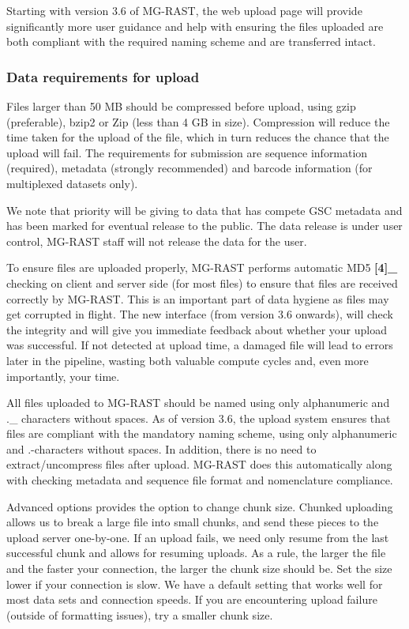 \documentclass[letterpaper,10pt,english]{sphinxmanual}
\begin{document}
Starting with version 3.6 of MG-RAST, the web upload page will provide
significantly more user guidance and help with ensuring the files
uploaded are both compliant with the required naming scheme and are
transferred intact.


\subsubsection{Data requirements for upload}
\label{\detokenize{faq:data-requirements-for-upload}}
Files larger than 50 MB should be compressed before upload, using gzip
(preferable), bzip2 or Zip (less than 4 GB in size). Compression will
reduce the time taken for the upload of the file, which in turn reduces
the chance that the upload will fail. The requirements for submission
are sequence information (required), metadata (strongly recommended) and
barcode information (for multiplexed datasets only).

We note that priority will be giving to data that has compete GSC
metadata and has been marked for eventual release to the public. The
data release is under user control, MG-RAST staff will not release the
data for the user.

To ensure files are uploaded properly, MG-RAST performs automatic
MD5 {\color{red}\bfseries{}{[}4{]}\_} checking on client and server side (for most files) to ensure
that files are received correctly by MG-RAST. This is an important part
of data hygiene as files may get corrupted in flight. The new interface
(from version 3.6 onwards), will check the integrity and will give you
immediate feedback about whether your upload was successful. If not
detected at upload time, a damaged file will lead to errors later in the
pipeline, wasting both valuable compute cycles and, even more
importantly, your time.

All files uploaded to MG-RAST should be named using only alphanumeric
and .\_ characters without spaces. As of version 3.6, the upload system
ensures that files are compliant with the mandatory naming scheme, using
only alphanumeric and .-characters without spaces. In addition, there is
no need to extract/uncompress files after upload. MG-RAST does this
automatically along with checking metadata and sequence file format and
nomenclature compliance.

Advanced options provides the option to change chunk size. Chunked
uploading allows us to break a large file into small chunks, and send
these pieces to the upload server one-by-one. If an upload fails, we
need only resume from the last successful chunk and allows for resuming
uploads. As a rule, the larger the file and the faster your connection,
the larger the chunk size should be. Set the size lower if your
connection is slow. We have a default setting that works well for most
data sets and connection speeds. If you are encountering upload failure
(outside of formatting issues), try a smaller chunk size.
\end{document}
